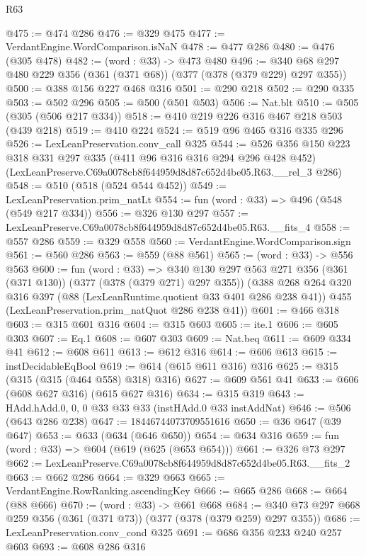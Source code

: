 \begin{lexlean}{R63}
\begin{coremodule}
@475 := @474 @286
@476 := @329 @475
@477 := VerdantEngine.WordComparison.isNaN
@478 := @477 @286
@480 := @476 (@305 @478)
@482 := (word : @33) -> @473 @480
@496 := @340 @68 @297 @480 @229 @356 (@361 (@371 @68)) (@377 (@378 (@379 @229) @297 @355))
@500 := @388 @156 @227 @468 @316
@501 := @290 @218
@502 := @290 @335
@503 := @502 @296
@505 := @500 (@501 @503)
@506 := Nat.blt
@510 := @505 (@305 (@506 @217 @334))
@518 := @410 @219 @226 @316 @467 @218 @503 (@439 @218)
@519 := @410 @224
@524 := @519 @96 @465 @316 @335 @296
@526 := LexLeanPreservation.conv_call @325
@544 := @526
    @356
    @150
    @223
    @318
    @331
    @297
    @335
    (@411 @96 @316 @316 @294 @296 @428 @452)
    (LexLeanPreserve.C69a0078cb8f644959d8d87c652d4be05.R63.__rel_3 @286)
@548 := @510 (@518 (@524 @544 @452))
@549 := LexLeanPreservation.prim_natLt
@554 := fun (word : @33) => @496 (@548 (@549 @217 @334))
@556 := @326 @130 @297
@557 := LexLeanPreserve.C69a0078cb8f644959d8d87c652d4be05.R63.__fits_4
@558 := @557 @286
@559 := @329 @558
@560 := VerdantEngine.WordComparison.sign
@561 := @560 @286
@563 := @559 (@88 @561)
@565 := (word : @33) -> @556 @563
@600 := fun (word : @33) =>
  @340
    @130
    @297
    @563
    @271
    @356
    (@361 (@371 @130))
    (@377 (@378 (@379 @271) @297 @355))
    (@388
      @268
      @264
      @320
      @316
      @397
      (@88 (LexLeanRuntime.quotient @33 @401 @286 @238 @41))
      @455
      (LexLeanPreservation.prim_natQuot @286 @238 @41))
@601 := @466 @318
@603 := @315 @601 @316
@604 := @315 @603
@605 := ite.{1}
@606 := @605 @303
@607 := Eq.{1}
@608 := @607 @303
@609 := Nat.beq
@611 := @609 @334 @41
@612 := @608 @611
@613 := @612 @316
@614 := @606 @613
@615 := instDecidableEqBool
@619 := @614 (@615 @611 @316) @316
@625 := @315 (@315 (@315 (@464 @558) @318) @316)
@627 := @609 @561 @41
@633 := @606 (@608 @627 @316) (@615 @627 @316)
@634 := @315 @319
@643 := HAdd.hAdd.{0, 0, 0} @33 @33 @33 (instHAdd.{0} @33 instAddNat)
@646 := @506 (@643 @286 @238)
@647 := 18446744073709551616
@650 := @36 @647 (@39 @647)
@653 := @633 (@634 (@646 @650))
@654 := @634 @316
@659 := fun (word : @33) => @604 (@619 (@625 (@653 @654)))
@661 := @326 @73 @297
@662 := LexLeanPreserve.C69a0078cb8f644959d8d87c652d4be05.R63.__fits_2
@663 := @662 @286
@664 := @329 @663
@665 := VerdantEngine.RowRanking.ascendingKey
@666 := @665 @286
@668 := @664 (@88 @666)
@670 := (word : @33) -> @661 @668
@684 := @340 @73 @297 @668 @259 @356 (@361 (@371 @73)) (@377 (@378 (@379 @259) @297 @355))
@686 := LexLeanPreservation.conv_cond @325
@691 := @686 @356 @233 @240 @257 @603
@693 := @608 @286 @316

\end{coremodule}
\end{lexlean}
